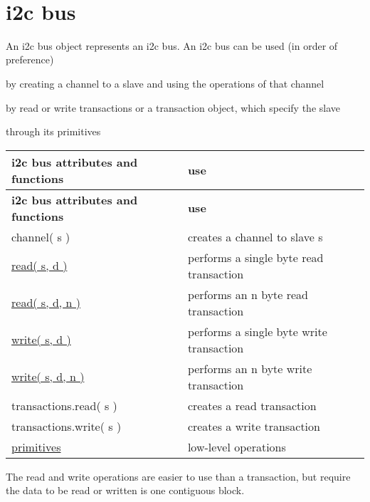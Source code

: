 ~\newline
 

\hypertarget{i2c_i2c-bus}{}\section{i2c bus}\label{i2c_i2c-bus}
An i2c bus object represents an i2c bus. An i2c bus can be used (in order of preference)
\begin{DoxyItemize}
\item by creating a channel to a slave and using the operations of that channel
\item by read or write transactions or a transaction object, which specify the slave
\item through its primitives
\end{DoxyItemize}

\tabulinesep=1mm
\begin{longtabu} spread 0pt [c]{*{2}{|X[-1]}|}
\hline
\rowcolor{\tableheadbgcolor}\textbf{ i2c bus attributes and functions }&\textbf{ use  }\\
\endfirsthead
\hline
\endfoot
\hline
\rowcolor{\tableheadbgcolor}\textbf{ i2c bus attributes and functions }&\textbf{ use  }\\
\endhead
channel( s ) &creates a channel to slave s \\
\hyperlink{classhwlib_1_1i2c__bus_ac4dd659c140ae5f8f7d6bbd48351d88f}{read( s, d )} &performs a single byte read transaction \\
\hyperlink{classhwlib_1_1i2c__bus_ac4dd659c140ae5f8f7d6bbd48351d88f}{read( s, d, n )} &performs an n byte read transaction \\
\hyperlink{classhwlib_1_1i2c__bus_ad0b808c4d9b1ed7b16ee13c735c25597}{write( s, d )} &performs a single byte write transaction \\
\hyperlink{classhwlib_1_1i2c__bus_ad0b808c4d9b1ed7b16ee13c735c25597}{write( s, d, n )} &performs an n byte write transaction \\
transactions.read( s ) &creates a read transaction \\
transactions.write( s ) &creates a write transaction \\
\hyperlink{classhwlib_1_1i2c__primitives}{primitives} &low-\/level operations \\
\end{longtabu}
The read and write operations are easier to use than a transaction, but require the data to be read or written is one contiguous block.

